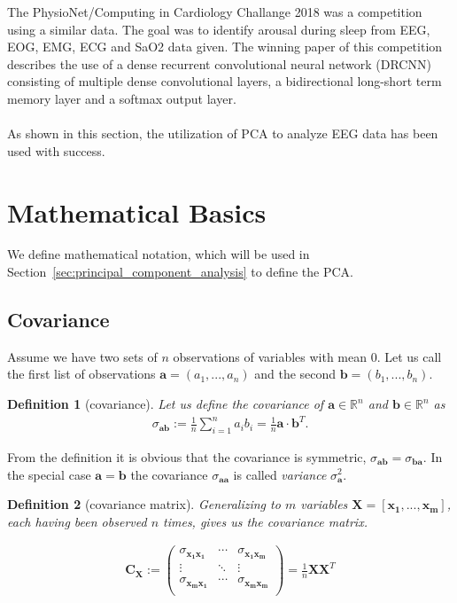 \documentclass[a4paper]{IEEEtran}
\newtheorem{definition}{Definition}
\begin{document}
The PhysioNet/Computing in Cardiology Challange 2018 was a competition using a similar data\cite{Ghassemi2018}. The goal was to identify arousal during sleep from EEG, EOG, EMG, ECG and SaO2 data given. The winning paper of this competition describes the use of a dense recurrent convolutional neural network (DRCNN) consisting of multiple dense convolutional layers, a bidirectional long-short term memory layer and a softmax output layer\cite{Howe2018}.
\\
\\
As shown in this section, the utilization of PCA to analyze EEG data has been used with success.

\section{Mathematical Basics}
\label{sec:mathematical_basics}

We define mathematical notation, which will be used in Section~\ref{sec:principal_component_analysis} to define the PCA.

\subsection{Covariance}
Assume we have two sets of $n$ observations of variables with mean $0$. Let us call the first list of observations $\mathbf{a} = (a_1, ..., a_n)$ and the second $\mathbf{b} = (b_1, ..., b_n)$.

\begin{definition}[covariance]
Let us define the \textit{covariance} of $\mathbf{a} \in \mathbb{R}^n$ and $\mathbf{b} \in \mathbb{R}^n$ as
\begin{align*}
	\sigma_{\mathbf{ab}} := \frac{1}{n} \sum_{i=1}^{n}a_ib_i = \frac{1}{n}\mathbf{a}\cdot\mathbf{b}^T.
\end{align*}
\end{definition}

From the definition it is obvious that the covariance is symmetric, $\sigma_{\mathbf{ab}} = \sigma_{\mathbf{ba}}$. In the special case $\mathbf{a} = \mathbf{b}$ the covariance $\sigma_{\mathbf{aa}}$ is called \textit{variance} $\sigma_{\mathbf{a}}^2$.

\begin{definition}[covariance matrix]
Generalizing to $m$ variables $\mathbf{X} = [\mathbf{x_1}, ..., \mathbf{x_m}]$, each having been observed $n$ times, gives us the \textit{covariance matrix}.

\begin{align*}
	\mathbf{C_X} := \left(\begin{matrix}
		\sigma_{\mathbf{x_1x_1}}	& \cdots & \sigma_{\mathbf{x_1x_m}}	\\
		\vdots						& \ddots & \vdots					\\
		\sigma_{\mathbf{x_mx_1}}	& \cdots & \sigma_{\mathbf{x_mx_m}}	\\
	\end{matrix}\right) = \frac{1}{n} \mathbf{X}\mathbf{X}^T
\end{align*}
\end{definition}
\end{document}

